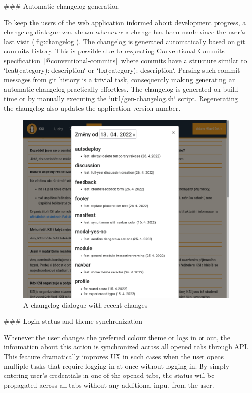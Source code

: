 \documentclass[
  digital, %
  oneside, %
  lof,     %
  nolot,     %
]{fithesis4}
\begin{document}
{### Automatic changelog generation
\label{chap:changelog}

To keep the users of the web application informed about development progress, a changelog dialogue was shown whenever a change has been made since the user's last visit (\autoref{fig:changelog}). The changelog is generated automatically based on git commits history. This is possible due to respecting Conventional Commits specification~[@conventional-commits], where commits have a structure similar to `feat(category): description` or `fix(category): description`. Parsing such commit messages from git history is a trivial task, consequently making generating an automatic changelog practically effortless. The changelog is generated on build time or by manually executing the `util/gen-changelog.sh` script. Regenerating the changelog also updates the application version number.

\begin{figure}
\includegraphics[width=\textwidth]{assets/img/changelog}
\caption{A changelog dialogue with recent changes}
\label{fig:changelog}
\end{figure}

### Login status and theme synchronization

Whenever the user changes the preferred colour theme or logs in or out, the information about this action is synchronized across all opened tabs through  API. This feature dramatically improves \acrshort{UX} in such cases when the user opens multiple tasks that require logging in at once without logging in. By simply entering user's credentials in one of the opened tabs, the status will be propagated across all tabs without any additional input from the user.

}
\end{document}
